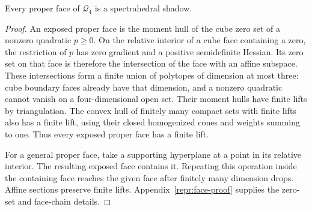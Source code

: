 \begin{proposition}\label{repr:proper-faces}
Every proper face of $\mathcal Q_4$ is a spectrahedral shadow.
\end{proposition}
\begin{proof}
An exposed proper face is the moment hull of the cube zero set of a nonzero
quadratic $p\geq0$. On the relative interior of a cube face containing a zero,
the restriction of $p$ has zero gradient and a positive semidefinite Hessian.
Its zero set on that face is therefore the intersection of the face with an
affine subspace. These intersections form a finite union of polytopes of
dimension at most three: cube boundary faces already have that dimension,
and a nonzero quadratic cannot vanish on a four-dimensional open set.
Their moment hulls have finite lifts by triangulation. The convex hull of
finitely many compact sets with finite lifts also has a finite lift, using
their closed homogenized cones and weights summing to one.
Thus every exposed proper face has a finite lift.

For a general proper face, take a supporting hyperplane at a point in its
relative interior. The resulting exposed face contains it. Repeating this
operation inside the containing face reaches the given face after finitely
many dimension drops. Affine sections preserve finite lifts.
Appendix~\ref{repr:face-proof} supplies the zero-set and face-chain details.
\end{proof}
